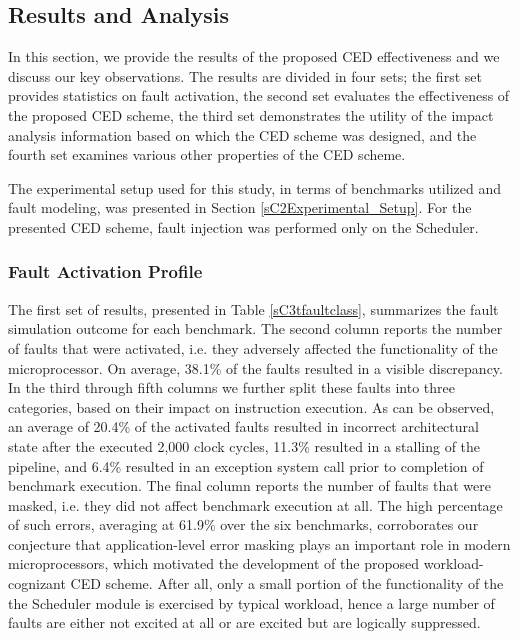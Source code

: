 \documentclass[12pt]{yalephd}
\newcommand{\snp}[1] {\noindent {\underline {#1}}}
\begin{document}
\subsection{Results and Analysis} \label{sC3sResults}

In this section, we provide the results of the proposed CED effectiveness and we discuss our key observations. The results are divided in four sets; the first set provides statistics on fault activation, the second set evaluates the effectiveness of the proposed CED scheme, the third set demonstrates the utility of the impact analysis information based on which the CED scheme was designed, and the fourth set examines various other properties of the CED scheme.

The experimental setup used for this study, in terms of benchmarks utilized and fault modeling, was presented in Section \ref{sC2Experimental_Setup}. For the presented CED scheme, fault injection was performed only on the Scheduler.

\subsubsection{Fault Activation Profile}

\snp{Fault simulation outcome:} The first set of results, presented in Table \ref{sC3tfaultclass}, summarizes the fault simulation outcome for each benchmark. The second column reports the number of faults that were activated, i.e. they adversely affected the functionality of the microprocessor. On average, 38.1\% of the faults resulted in a visible discrepancy. In the third through fifth columns we further split these faults into three categories, based on their impact on instruction execution. As can be observed, an average of 20.4\% of the activated faults resulted in incorrect architectural state after the executed 2,000 clock cycles, 11.3\% resulted in a stalling of the pipeline, and 6.4\% resulted in an exception system call prior to completion of benchmark execution. The final column reports the number of faults that were masked, i.e. they did not affect benchmark execution at all. The high percentage of such errors, averaging at 61.9\% over the six benchmarks, corroborates our conjecture that application-level error masking plays an important role in modern microprocessors, which motivated the development of the proposed workload-cognizant CED scheme. After all, only a small portion of the functionality of the the Scheduler module is exercised by typical workload, hence a large number of faults are either not excited at all or are excited but are logically suppressed.
\end{document}
